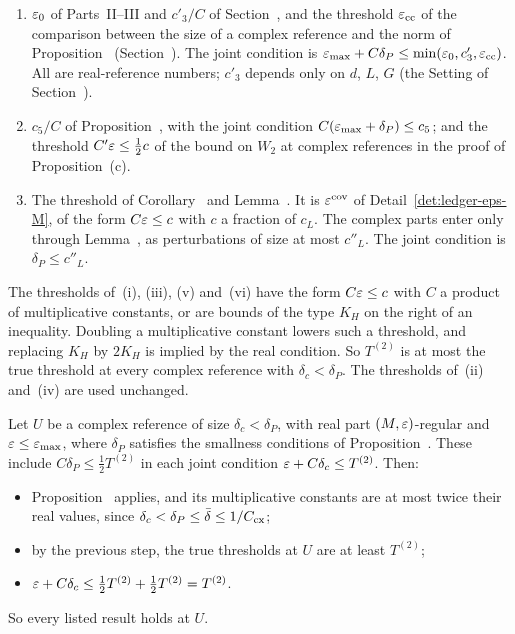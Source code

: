 \begin{detail}
\begin{step}
\begin{enumerate}[label=(\roman*)]
\item $\varepsilon_0$ of Parts~II--III and $c'_3/C$ of Section~, and the threshold $\varepsilon_{\rm cc}$ of the comparison between the size of a complex reference and the norm of Proposition~ (Section~). The joint condition is $\varepsilon_{\max}+C\delta_P\le\min(\varepsilon_0,c'_3,\varepsilon_{\rm cc})$. All are real-reference numbers; $c'_3$ depends only on $d$, $L$, $G$ (the Setting of Section~).
\item $c_5/C$ of Proposition~, with the joint condition $C(\varepsilon_{\max}+\delta_P)\le c_5$; and the threshold $C'\varepsilon\le\frac12c$ of the bound on $W_2$ at complex references in the proof of Proposition~(c).
\item The threshold of Corollary~ and Lemma~. It is $\varepsilon^{\rm cov}$ of Detail~\ref{det:ledger-eps-M}, of the form $C\varepsilon\le c$ with $c$ a fraction of $c_L$. The complex parts enter only through Lemma~, as perturbations of size at most $c''_L$. The joint condition is $\delta_P\le c''_L$.
\end{enumerate}
The thresholds of~(i), (iii), (v) and~(vi) have the form $C\varepsilon\le c$ with $C$ a product of multiplicative constants, or are bounds of the type $K_H$ on the right of an inequality. Doubling a multiplicative constant lowers such a threshold, and replacing $K_H$ by $2K_H$ is implied by the real condition. So $T^{(2)}$ is at most the true threshold at every complex reference with $\delta_c<\delta_P$. The thresholds of~(ii) and~(iv) are used unchanged.
\end{step}

\begin{step}
Let $U$ be a complex reference of size $\delta_c<\delta_P$, with real part $(M,\varepsilon)$-regular and $\varepsilon\le\varepsilon_{\max}$, where $\delta_P$ satisfies the smallness conditions of Proposition~. These include $C\delta_P\le\frac12T^{(2)}$ in each joint condition $\varepsilon+C\delta_c\le T^{(2)}$. Then:
\begin{itemize}
\item Proposition~ applies, and its multiplicative constants are at most twice their real values, since $\delta_c<\delta_P\le\bar\delta\le1/C_{\rm cx}$;
\item by the previous step, the true thresholds at $U$ are at least $T^{(2)}$;
\item $\varepsilon+C\delta_c\le\frac12T^{(2)}+\frac12T^{(2)}=T^{(2)}$.
\end{itemize}
So every listed result holds at $U$.


\end{step}
\end{detail}
